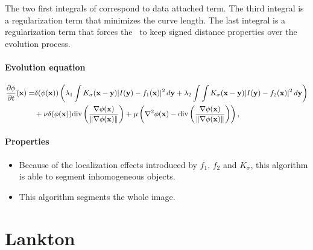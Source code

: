 The two first integrals of  correspond to data attached term. The third integral is a regularization term that minimizes the curve length. The last integral is a regularization term that forces the \ls~to keep signed distance properties over the evolution process.

\paragraph{Evolution equation}
\begin{eqnarray}
	\label{eq:evol_li}
	\nonumber \frac{\partial \phi}{\partial t}(\mathbf{x}) = & \delta(\phi(\mathbf{x})) \left( \lambda_1 \int K_\sigma(\mathbf{x} - \mathbf{y}) | I(\mathbf{y}) - f_1(\mathbf{x}) |^2 \, d\mathbf{y} + \lambda_2 \int \int K_\sigma(\mathbf{x} - \mathbf{y}) | I(\mathbf{y}) - f_2(\mathbf{x}) |^2 \, d\mathbf{y} \right) \\ 
	& + \nu \delta(\phi(\mathbf{x})) \text{div}\left(\frac{\nabla \phi(\mathbf{x})}{\|\nabla \phi(\mathbf{x})\|}\right) + \mu \left( \nabla^2 \phi(\mathbf{x}) - \text{div}\left(\frac{\nabla \phi(\mathbf{x})}{\|\nabla \phi(\mathbf{x})\|}\right) \right),
\end{eqnarray}

\paragraph{Properties}

\begin{itemize}
	\item Because of the localization effects introduced by $f_1$, $f_2$ and $K_\sigma$, this algorithm is able to segment inhomogeneous objects.
	\item This algorithm segments the whole image.
\end{itemize}


\newpage
\section[Lankton]{Lankton \cite{Lankton2008}}
\label{sec:Lankton}

